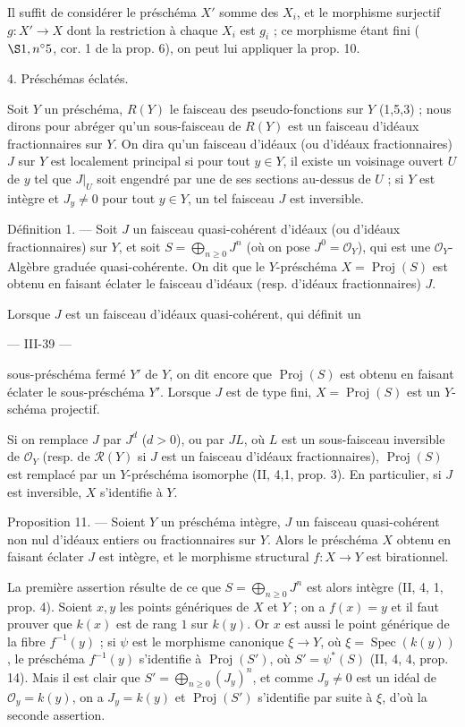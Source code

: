 Il suffit de considérer le préschéma $X'$ somme des $X_i$, et le morphisme surjectif $g : X' \to X$ dont la restriction à chaque $X_i$ est $g_i$ ; ce morphisme étant fini ($\S 1, n^\circ 5$, cor. 1 de la prop. 6), on peut lui appliquer la prop. 10.

4. Préschémas éclatés.

Soit $Y$ un préschéma, $R(Y)$ le faisceau des pseudo-fonctions sur $Y$ (1,5,3) ; nous dirons pour abréger qu'un sous-faisceau de $R(Y)$ est un faisceau d'idéaux fractionnaires sur $Y$. On dira qu'un faisceau d'idéaux (ou d'idéaux fractionnaires) $J$ sur $Y$ est localement principal si pour tout $y \in Y$, il existe un voisinage ouvert $U$ de $y$ tel que $J|_U$ soit engendré par une de ses sections au-dessus de $U$ ; si $Y$ est intègre et $J_y \neq 0$ pour tout $y \in Y$, un tel faisceau $J$ est inversible.

Définition 1. — Soit $J$ un faisceau quasi-cohérent d'idéaux (ou d'idéaux fractionnaires) sur $Y$, et soit $S = \bigoplus_{n \geq 0} J^n$ (où on pose $J^0 = \mathcal{O}_Y$), qui est une $\mathcal{O}_Y$-Algèbre graduée quasi-cohérente. On dit que le $Y$-préschéma $X = \operatorname{Proj}(S)$ est obtenu en faisant éclater le faisceau d'idéaux (resp. d'idéaux fractionnaires) $J$.

Lorsque $J$ est un faisceau d'idéaux quasi-cohérent, qui définit un

\newpage


--- III-39 ---

sous-préschéma fermé $Y'$ de $Y$, on dit encore que $\operatorname{Proj}(S)$ est obtenu en faisant éclater le sous-préschéma $Y'$. Lorsque $J$ est de type fini, $X = \operatorname{Proj}(S)$ est un $Y$-schéma projectif.

Si on remplace $J$ par $J^d$ ($d > 0$), ou par $JL$, où $L$ est un sous-faisceau inversible de $\mathcal{O}_Y$ (resp. de $\mathcal{R}(Y)$ si $J$ est un faisceau d'idéaux fractionnaires), $\operatorname{Proj}(S)$ est remplacé par un $Y$-préschéma isomorphe (II, 4,1, prop. 3). En particulier, si $J$ est inversible, $X$ s'identifie à $Y$.

Proposition 11. — Soient $Y$ un préschéma intègre, $J$ un faisceau quasi-cohérent non nul d'idéaux entiers ou fractionnaires sur $Y$. Alors le préschéma $X$ obtenu en faisant éclater $J$ est intègre, et le morphisme structural $f : X \to Y$ est birationnel.

La première assertion résulte de ce que $S = \bigoplus_{n \ge 0} J^n$ est alors intègre (II, 4, 1, prop. 4). Soient $x, y$ les points génériques de $X$ et $Y$ ; on a $f(x) = y$ et il faut prouver que $k(x)$ est de rang $1$ sur $k(y)$. Or $x$ est aussi le point générique de la fibre $f^{-1}(y)$ ; si $\psi$ est le morphisme canonique $\xi \to Y$, où $\xi = \operatorname{Spec}(k(y))$, le préschéma $f^{-1}(y)$ s'identifie à $\operatorname{Proj}(S')$, où $S' = \psi^*(S)$ (II, 4, 4, prop. 14). Mais il est clair que $S' = \bigoplus_{n \ge 0} (J_y)^n$, et comme $J_y \neq 0$ est un idéal de $\mathcal{O}_y = k(y)$, on a $J_y = k(y)$ et $\operatorname{Proj}(S')$ s'identifie par suite à $\xi$, d'où la seconde assertion.


